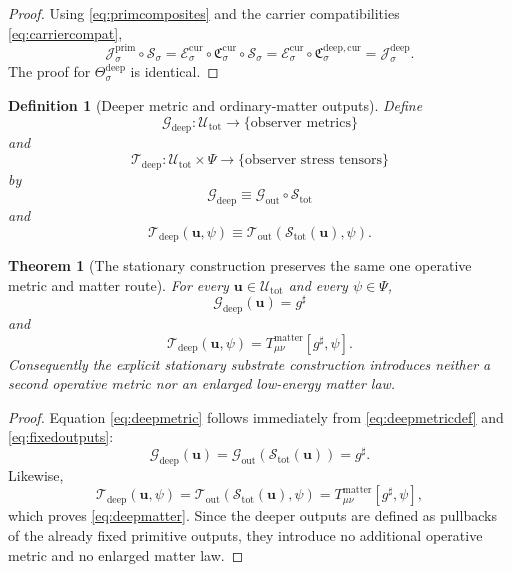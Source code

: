 \documentclass[11pt]{article}
\newcommand{\CompletedMetric}{g^{\sharp}}
\newcommand{\CurrentCarrier}[1]{\mathfrak C_{#1}^{\mathrm{cur}}}
\newcommand{\CurrentExtract}[1]{\mathscr E_{#1}^{\mathrm{cur}}}
\newcommand{\PrimCurrent}[1]{\mathcal J_{#1}^{\mathrm{prim}}}
\newcommand{\MetricOut}{\mathscr G_{\mathrm{out}}}
\newcommand{\MatterOut}{\mathscr T_{\mathrm{out}}}
\newcommand{\DeepMetricOut}{\mathscr G_{\mathrm{deep}}}
\newcommand{\DeepMatterOut}{\mathscr T_{\mathrm{deep}}}
\newcommand{\DeepCurrentCarrier}[1]{\mathfrak C_{#1}^{\mathrm{deep,cur}}}
\newcommand{\ChainSelect}[1]{\mathcal S_{#1}}
\newcommand{\DeepCurrent}[1]{\mathcal J_{#1}^{\mathrm{deep}}}
\newcommand{\DeepTheta}[1]{\Theta_{#1}^{\mathrm{deep}}}
\newcommand{\DeepShell}{\mathcal U_{\mathrm{tot}}}
\newcommand{\ChainSelectTriple}{\mathcal S_{\mathrm{tot}}}
\newtheorem{definition}{Definition}
\newtheorem{theorem}{Theorem}
\begin{document}
\begin{proof}
Using \eqref{eq:primcomposites} and the carrier compatibilities \eqref{eq:carriercompat},
\[
\PrimCurrent{\sigma}\circ \ChainSelect{\sigma}
=
\CurrentExtract{\sigma}\circ \CurrentCarrier{\sigma}\circ \ChainSelect{\sigma}
=
\CurrentExtract{\sigma}\circ \DeepCurrentCarrier{\sigma}
=
\DeepCurrent{\sigma}.
\]
The proof for \(\DeepTheta{\sigma}\) is identical.
\end{proof}

\begin{definition}[Deeper metric and ordinary-matter outputs]
\label{def:deepoutputs}
Define
\[
\DeepMetricOut:\DeepShell\to\{\text{observer metrics}\}
\]
and
\[
\DeepMatterOut:\DeepShell\times\Psi\to\{\text{observer stress tensors}\}
\]
by
\begin{equation}
\DeepMetricOut
\equiv
\MetricOut\circ \ChainSelectTriple
\label{eq:deepmetricdef}
\end{equation}
and
\begin{equation}
\DeepMatterOut(\mathbf u,\psi)
\equiv
\MatterOut(\ChainSelectTriple(\mathbf u),\psi).
\label{eq:deepmatterdef}
\end{equation}
\end{definition}

\begin{theorem}[The stationary construction preserves the same one operative metric and matter route]
\label{thm:deepmetric}
For every \(\mathbf u\in\DeepShell\) and every \(\psi\in\Psi\),
\begin{equation}
\DeepMetricOut(\mathbf u)=\CompletedMetric
\label{eq:deepmetric}
\end{equation}
and
\begin{equation}
\DeepMatterOut(\mathbf u,\psi)
=
T_{\mu\nu}^{\mathrm{matter}}[\CompletedMetric,\psi].
\label{eq:deepmatter}
\end{equation}
Consequently the explicit stationary substrate construction introduces neither a second operative metric nor an enlarged low-energy matter law.
\end{theorem}

\begin{proof}
Equation \eqref{eq:deepmetric} follows immediately from \eqref{eq:deepmetricdef} and \eqref{eq:fixedoutputs}:
\[
\DeepMetricOut(\mathbf u)
=
\MetricOut(\ChainSelectTriple(\mathbf u))
=
\CompletedMetric.
\]
Likewise,
\[
\DeepMatterOut(\mathbf u,\psi)
=
\MatterOut(\ChainSelectTriple(\mathbf u),\psi)
=
T_{\mu\nu}^{\mathrm{matter}}[\CompletedMetric,\psi],
\]
which proves \eqref{eq:deepmatter}. Since the deeper outputs are defined as pullbacks of the already fixed primitive outputs, they introduce no additional operative metric and no enlarged matter law.
\end{proof}
\end{document}

